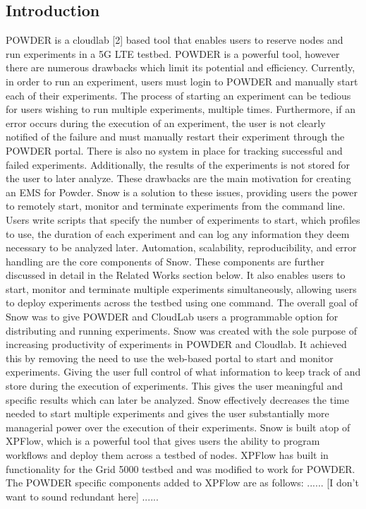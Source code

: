\documentclass[12pt, letterpaper]{article}
\begin{document}
\begin{multicols}{2}
\section{Introduction}
\qquad POWDER is a cloudlab [2] based tool that enables users to reserve nodes and run experiments in a 5G LTE testbed. POWDER is a powerful tool, however there are numerous drawbacks which limit its potential and efficiency. Currently, in order to run an experiment, users must login to POWDER and manually start each of their experiments.  The process of starting an experiment can be tedious for users wishing to run multiple experiments, multiple times.  Furthermore, if an error occurs during the execution of an experiment, the user is not clearly notified of the failure and must manually restart their experiment through the POWDER portal.  There is also no system in place for tracking successful and failed experiments.  Additionally, the results of the experiments is not stored for the user to later analyze.  These drawbacks are the main motivation for creating an EMS for Powder.  \newline
\qquad Snow is a solution to these issues, providing users the power to remotely start, monitor and terminate experiments from the command line.  Users write scripts that specify the number of experiments to start, which profiles to use, the duration of each experiment and can log any information they deem necessary to be analyzed later.  Automation, scalability, reproducibility, and error handling are the core components of Snow. These components are further discussed in detail in the Related Works section below. It also enables users to start, monitor and terminate multiple experiments simultaneously, allowing users to deploy experiments across the testbed using one command.  \newline
\qquad The overall goal of Snow was to give POWDER and CloudLab users a programmable option for distributing and running experiments.  Snow was created with the sole purpose of increasing productivity of experiments in POWDER and Cloudlab.  It achieved this by removing the need to use the web-based portal to start and monitor experiments.  Giving the user full control of what information to keep track of and store during the execution of experiments.  This gives the user meaningful and specific results which can later be analyzed.  Snow effectively decreases the time needed to start multiple experiments and gives the user substantially more managerial power over the execution of their experiments.\newline
\qquad Snow is built atop of XPFlow, which is a powerful tool that gives users the ability to program workflows and deploy them across a testbed of nodes.  XPFlow has built in functionality for the Grid 5000 testbed and was modified to work for POWDER.  The POWDER specific components added to XPFlow are as follows: ...... [I don't want to sound redundant here] ...... 

\end{multicols}
\end{document}
